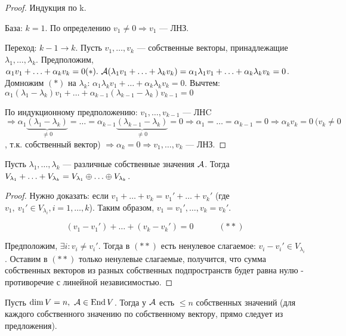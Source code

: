 \documentclass[main]{subfiles}
\begin{document}
\begin{proof}
    Индукция по k.

    База: $k = 1$.  По определению $v_1 \neq 0 \Rightarrow v_1$ — ЛНЗ.

    Переход: $k-1 \rightarrow k$. Пусть $v_1, \ldots, v_k$  — собственные
    векторы, принадлежащие $\lambda_1, \ldots, \lambda_k$.
    Предположим, $\alpha_1 v_1 + \ldots + \alpha_k v_k = 0 (*).\
        \mathcal{A}(\lambda_1 v_1 + \ldots + \lambda_k v_k) =
        \alpha_1 \lambda_1 v_1 + \ldots + \alpha_k \lambda_k v_k = 0$.  Домножим $(*)$ на $\lambda_k$:
    $\alpha_1 \lambda_k v_1 + \ldots + \alpha_k \lambda_k v_k = 0$.
    Вычтем: $\alpha_1(\lambda_1 - \lambda_k)v_1 + \ldots + \alpha_{k-1}(\lambda_{k-1} - \lambda_k)v_{k-1} = 0$

    По индукционному предположению: $v_1, \ldots, v_{k-1}$ — ЛНC
    $\Rightarrow \alpha_1\underbrace{(\lambda_1 - \lambda_k)}_{\neq 0} = \ldots =
        \alpha_{k-1}\underbrace{(\lambda_{k-1} - \lambda_k)}_{\neq 0} = 0 \Rightarrow
        \alpha_1 = \ldots = \alpha_{k-1} = 0 \Rightarrow \alpha_k v_k = 0\ (v_k \neq 0$, т.к. собственный вектор) $\Rightarrow \alpha_k = 0 \Rightarrow
        v_1, \ldots, v_k$ — ЛНЗ.
\end{proof}

\begin{corollary}
    Пусть $\lambda_1, \ldots, \lambda_k$ — различные собственные значения $\mathcal{A}$.
    Тогда   $V_{\lambda_1} + \ldots + V_{\lambda_k} =
        V_{\lambda_1} \oplus \ldots \oplus  V_{\lambda_k}$.
\end{corollary}

\begin{proof}
    Нужно доказать: если $v_1 + \ldots + v_k = v_1' + \ldots + v_k'$
    (где $v_1,\ v_1' \in V_{\lambda_i}, i = 1, \ldots, k$).
    Таким образом, $v_1 = v_1', \ldots, v_k = v_k'$.

    \[(v_1 - v_1') + \ldots + (v_k - v_k') = 0 \quad \quad \quad (**)\]

    Предположим, $\exists i : v_i \neq v_i'$. Тогда в $(**)$  есть ненулевое слагаемое:
    $v_i - v_i' \in V_{\lambda_i}$. Оставим в $(**)$ только ненулевые
    слагаемые, получится, что сумма собственных векторов из разных собственных подпространств будет равна нулю - противоречие с линейной независимостью.
\end{proof}

\begin{corollary}
    Пусть $\dim V = n,\ \mathcal{A} \in \operatorname{End} V$. Тогда у  $\mathcal{A}$ есть $\le n$ собственных значений (для каждого собственного значению по собственному вектору, прямо следует из предложения).
\end{corollary}
\end{document}
